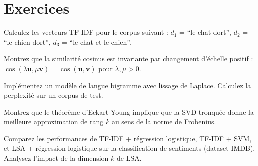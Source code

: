 \section{Exercices}
\label{sec:rep:exercices}

\begin{exercice}[$\star$]
Calculez les vecteurs TF-IDF pour le corpus suivant :
$d_1$ = ``le chat dort'', $d_2$ = ``le chien dort'', $d_3$ = ``le chat et le chien''.
\end{exercice}

\begin{exercice}[$\star$]
Montrez que la similarit\'e cosinus est invariante par changement d'\'echelle
positif : $\cos(\lambda \mathbf{u}, \mu \mathbf{v}) = \cos(\mathbf{u}, \mathbf{v})$
pour $\lambda, \mu > 0$.
\end{exercice}

\begin{exercice}[$\star\star$]
Impl\'ementez un mod\`ele de langue bigramme avec lissage de Laplace. Calculez
la perplexit\'e sur un corpus de test.
\end{exercice}

\begin{exercice}[$\star\star$]
Montrez que le th\'eor\`eme d'Eckart-Young implique que la SVD tronqu\'ee donne
la meilleure approximation de rang $k$ au sens de la norme de Frobenius.
\end{exercice}

\begin{exercice}[$\star\star\star$]
Comparez les performances de TF-IDF + r\'egression logistique, TF-IDF + SVM,
et LSA + r\'egression logistique sur la classification de sentiments (dataset
IMDB). Analysez l'impact de la dimension $k$ de LSA.
\end{exercice}
